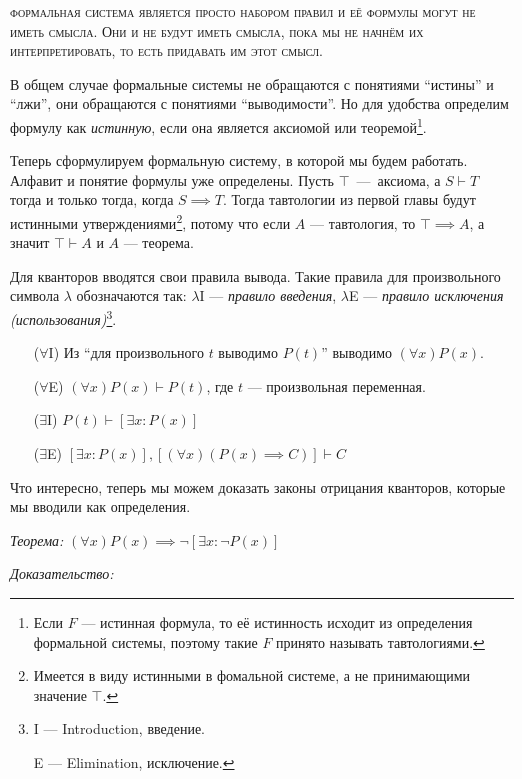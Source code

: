 \textsc{формальная система является просто набором правил и её формулы
	могут не иметь смысла. Они и не будут иметь смысла, пока мы не начнём их
	интерпретировать, то есть придавать им этот смысл.}

В общем случае формальные системы не обращаются с понятиями ``истины'' и ``лжи'',
они обращаются с понятиями ``выводимости''. Но для удобства определим формулу
как {\it истинную}, если она является аксиомой или теоремой\footnote{
	Если $F$ --- истинная формула, то её истинность исходит из
	определения формальной системы, поэтому такие $F$ принято называть тавтологиями.
}.

Теперь сформулируем формальную систему, в которой мы будем работать.
Алфавит и понятие формулы уже определены. Пусть $\top$~---~аксиома,
а $S\vdash T$ тогда и только тогда, когда ${S\implies T}$.
Тогда тавтологии из первой главы будут истинными
утверждениями\footnote{Имеется в виду истинными в фомальной системе,
	а не принимающими значение $\top$.}, потому что если $A$ --- тавтология,
то ${\top\implies A}$, а значит $\top\vdash A$ и $A$ --- теорема.

\pagebreak

Для кванторов вводятся свои правила вывода. Такие правила для произвольного
символа $\lambda$ обозначаются так: $\lambda$I --- {\it правило
введения}, $\lambda$E --- {\it правило исключения (использования)}\footnote{
	I --- Introduction, введение.

	E --- Elimination, исключение.
}.

\newcommand\Aii{$\forall$I}
\newcommand\Aee{$\forall$E}
\newcommand\Eii{$\exists$I}
\newcommand\Eee{$\exists$E}
\begin{enumerate}
	\item[(\Aii)]{}Из ``для произвольного $t$ выводимо $P(t)$''
	выводимо $(\forall x)P(x)$.
	\item[(\Aee)]{}$(\forall x)P(x)\vdash P(t)$, где $t$ --- произвольная переменная.
	\item[(\Eii)]{}$P(t)\vdash [\exists x:P(x)]$
	\item[(\Eee)]{}$[\exists x:P(x)], [(\forall x)(P(x)\implies C)]\vdash C$
\end{enumerate}

Что интересно, теперь мы можем доказать законы отрицания кванторов,
которые мы вводили как определения.

\label{wordproof}
{\it Теорема:}
$(\forall x)P(x)\implies \lnot[\exists x:\lnot P(x)]$

{\it Доказательство:}

